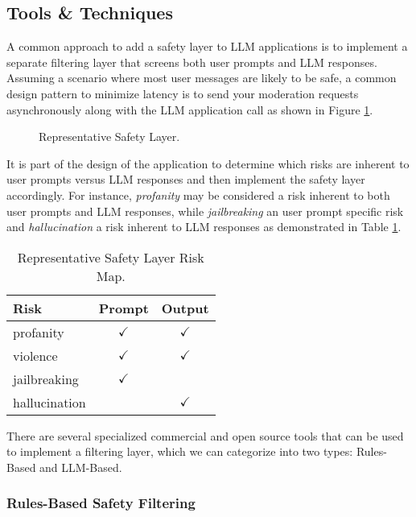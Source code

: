 \subsection{Tools \& Techniques}

A common approach to add a safety layer to LLM applications is to implement a separate filtering layer that screens both user prompts and LLM responses. Assuming a scenario where most user messages are likely to be safe, a common design pattern to minimize latency is to send your moderation requests asynchronously along with the LLM application call as shown in Figure \ref{safety_layer}.

\begin{figure}[H]
\centering

\caption{Representative Safety Layer.}
\label{safety_layer}
\end{figure}

It is part of the design of the application to determine which risks are inherent to user prompts versus LLM responses and then implement the safety layer accordingly. For instance, \textit{profanity} may be considered a risk inherent to both user prompts and LLM responses, while \textit{jailbreaking} an user prompt specific risk and \textit{hallucination} a risk inherent to LLM responses as demonstrated in Table \ref{safety_layer_table}.

\begin{table}[H]
\caption{Representative Safety Layer Risk Map.}
\label{safety_layer_table}
\centering
\begin{tabular}{|l|c|c|}
\hline
Risk & Prompt & Output\\
\hline
profanity & $\checkmark$ & $\checkmark$ \\
violence & $\checkmark$ & $\checkmark$ \\
jailbreaking & $\checkmark$ & \\
hallucination & & $\checkmark$ \\
\hline
\end{tabular}
\end{table}

There are several specialized commercial and open source tools that can be used to implement a filtering layer, which we can categorize into two types: Rules-Based and LLM-Based.

\subsubsection{Rules-Based Safety Filtering}


